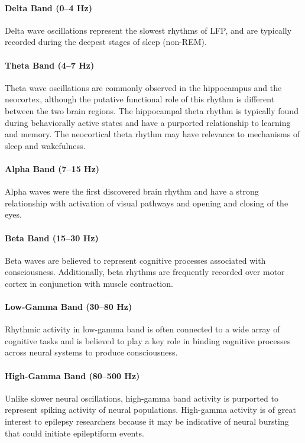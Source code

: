 \paragraph{Delta Band (0--4 Hz)}
Delta wave oscillations represent the slowest rhythms of LFP, and are typically recorded during the deepest stages of sleep (non-REM).

\paragraph{Theta Band (4--7 Hz)}
Theta wave oscillations are commonly observed in the hippocampus and the neocortex, although the putative functional role of this rhythm is different between the two brain regions. The hippocampal theta rhythm is typically found during behaviorally active states and have a purported relationship to learning and memory. The neocortical theta rhythm may have relevance to mechanisms of sleep and wakefulness.

\paragraph{Alpha Band (7--15 Hz)}
Alpha waves were the first discovered brain rhythm and have a strong relationship with activation of visual pathways and opening and closing of the eyes. 

\paragraph{Beta Band (15--30 Hz)}
Beta waves are believed to represent cognitive processes associated with consciousness. Additionally, beta rhythms are frequently recorded over motor cortex in conjunction with muscle contraction.

\paragraph{Low-Gamma Band (30--80 Hz)}
Rhythmic activity in low-gamma band is often connected to a wide array of cognitive tasks and is believed to play a key role in binding cognitive processes across neural systems to produce consciousness. 

\paragraph{High-Gamma Band (80--500 Hz)} 
Unlike slower neural oscillations, high-gamma band activity is purported to represent spiking activity of neural populations. High-gamma activity is of great interest to epilepsy researchers because it may be indicative of neural bursting that could initiate epileptiform events.

